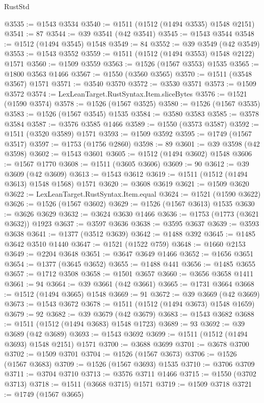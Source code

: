 \begin{lexlean}{RustStd}
\begin{coremodule}
{{@3535 := @1543 @3534
@3540 := @1511 (@1512 (@1494 @3535) @1548 @2151)
@3541 := 87
@3544 := @39 @3541 (@42 @3541)
@3545 := @1543 @3544
@3548 := @1512 (@1494 @3545) @1548
@3549 := 84
@3552 := @39 @3549 (@42 @3549)
@3553 := @1543 @3552
@3559 := @1511 (@1512 (@1494 @3553) @1548 @2122) @1571
@3560 := @1509 @3559
@3563 := @1526 (@1567 @3553) @1535
@3565 := @1800 @3563 @1466
@3567 := @1550 (@3560 @3565)
@3570 := @1511 (@3548 @3567) @1571
@3571 := @3540 @3570
@3572 := @3530 @3571
@3573 := @1509 @3572
@3574 := LexLeanTarget.RustSyntax.Item.sliceBytes
@3576 := @1521 (@1590 @3574)
@3578 := @1526 (@1567 @3525)
@3580 := @1526 (@1567 @3535)
@3583 := @1526 (@1567 @3545) @1535
@3584 := @3580 @3583
@3585 := @3578 @3584
@3587 := @3576 @3585 @1466
@3589 := @1550 (@3573 @3587)
@3592 := @1511 (@3520 @3589) @1571
@3593 := @1509 @3592
@3595 := @1749 (@1567 @3517)
@3597 := @1753 (@1756 @2860)
@3598 := 89
@3601 := @39 @3598 (@42 @3598)
@3602 := @1543 @3601
@3605 := @1512 (@1494 @3602) @1548
@3606 := @1567 @1770
@3608 := @1511 (@3605 @3606)
@3609 := 90
@3612 := @39 @3609 (@42 @3609)
@3613 := @1543 @3612
@3619 := @1511 (@1512 (@1494 @3613) @1548 @1568) @1571
@3620 := @3608 @3619
@3621 := @1509 @3620
@3622 := LexLeanTarget.RustSyntax.Item.equal
@3624 := @1521 (@1590 @3622)
@3626 := @1526 (@1567 @3602)
@3629 := @1526 (@1567 @3613) @1535
@3630 := @3626 @3629
@3632 := @3624 @3630 @1466
@3636 := @1753 (@1773 (@3621 @3632)) @1923
@3637 := @3597 @3636
@3638 := @3595 @3637
@3639 := @3593 @3638
@3641 := @1377 (@3512 @3639)
@3642 := @1488 @392
@3645 := @1485 @3642 @3510 @1440
@3647 := @1521 (@1522 @759)
@3648 := @1660 @2153
@3649 := @2204 @3648
@3651 := @3647 @3649 @1466
@3652 := @1656 @3651
@3654 := @1377 (@3645 @3652)
@3655 := @1488 @441
@3656 := @1485 @3655
@3657 := @1712 @3508
@3658 := @1501 @3657
@3660 := @3656 @3658 @1411
@3661 := 94
@3664 := @39 @3661 (@42 @3661)
@3665 := @1731 @3664
@3668 := @1512 (@1494 @3665) @1548
@3669 := 91
@3672 := @39 @3669 (@42 @3669)
@3673 := @1543 @3672
@3678 := @1511 (@1512 (@1494 @3673) @1548 @1659)
@3679 := 92
@3682 := @39 @3679 (@42 @3679)
@3683 := @1543 @3682
@3688 := @1511 (@1512 (@1494 @3683) @1548 @1723)
@3689 := 93
@3692 := @39 @3689 (@42 @3689)
@3693 := @1543 @3692
@3699 := @1511 (@1512 (@1494 @3693) @1548 @2151) @1571
@3700 := @3688 @3699
@3701 := @3678 @3700
@3702 := @1509 @3701
@3704 := @1526 (@1567 @3673)
@3706 := @1526 (@1567 @3683)
@3709 := @1526 (@1567 @3693) @1535
@3710 := @3706 @3709
@3711 := @3704 @3710
@3713 := @3576 @3711 @1466
@3715 := @1550 (@3702 @3713)
@3718 := @1511 (@3668 @3715) @1571
@3719 := @1509 @3718
@3721 := @1749 (@1567 @3665)
}}
\end{coremodule}
\end{lexlean}
